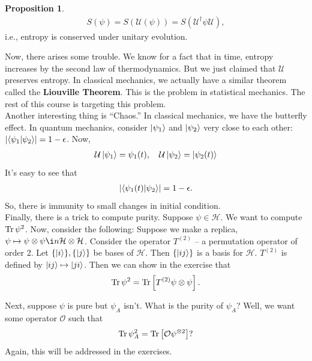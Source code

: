 \documentclass{book}
\theoremstyle{definition}
\newtheorem{prop}{Proposition}[section]
\newcommand{\had}{\mathcal{H}}
\newcommand{\lb}{\left[}
\newcommand{\rb}{\right]}
\begin{document}
\begin{prop}
	\begin{align}
	S(\psi) = S(\mathcal{U}(\psi)) = S(\mathcal{U}^\dagger \psi \mathcal{U}),
	\end{align}
	i.e., entropy is conserved under unitary evolution. 
\end{prop}

Now, there arises some trouble. We know for a fact that in time, entropy increases by the second law of thermodynamics. But we just claimed that $\mathcal{U}$ preserves entropy. In classical mechanics, we actually have a similar theorem called the \textbf{Liouville Theorem}. This is the problem in statistical mechanics. The rest of this course is targeting this problem.\\



Another interesting thing is ``Chaos.'' In classical mechanics, we have the butterfly effect. In quantum mechanics, consider $\ket{\psi_1}$ and $\ket{\psi_2}$ very close to each other: $\abs{\braket{\psi_1}{\psi_2}} = 1-\epsilon$. Now, 
\begin{align}
\mathcal{U}\ket{\psi_1} = \psi_1(t), \quad \mathcal{U}\ket{\psi_2} = \ket{\psi_2(t)}
\end{align}
It's easy to see that 
\begin{align}
\abs{\bra{\psi_1(t)}\ket{\psi_2}} = 1-\epsilon.
\end{align}
So, there is immunity to small changes in initial condition. \\


Finally, there is a trick to compute purity. Suppose $\psi \in \had$. We want to compute $\Tr \psi^2$. Now, consider the following: Suppose we make a replica, $\psi \mapsto \psi\otimes \psi \i n\had\otimes \had$. Consider the operator $T^{(2)}$ -- a permutation operator of order 2. Let $\{ \ket{i} \}, \{ \ket{j} \}$ be bases of $\had$. Then $\{ \ket{ij} \}$ is a basis for $\had$. $T^{(2)}$ is defined by $\ket{ij} \mapsto \ket{ji}$. Then we can show in the exercise that
\begin{align}
\Tr\psi^2 = \Tr\lb T^{(2)} \psi \otimes \psi \rb.
\end{align}

Next, suppose $\psi$ is pure but $\psi_A$ isn't. What is the purity of $\psi_A$? Well, we want some operator $\mathcal{O}$ such that
\begin{align}
\Tr \psi_A^2 = \Tr\lb \mathcal{O} \psi^{\otimes 2}  \rb?
\end{align}
Again, this will be addressed in the exercises. \\
\end{document}
